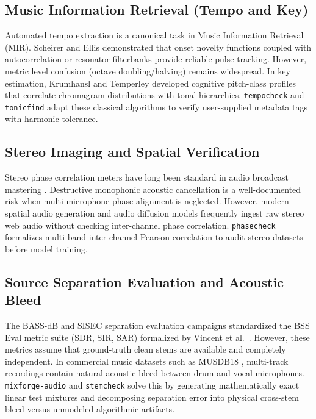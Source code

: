 \documentclass[10pt,journal,compsoc]{IEEEtran}
\begin{document}
\subsection{Music Information Retrieval (Tempo and Key)}
Automated tempo extraction is a canonical task in Music Information Retrieval (MIR). Scheirer \cite{scheirer1998tempo} and Ellis \cite{ellis2007beat} demonstrated that onset novelty functions coupled with autocorrelation or resonator filterbanks provide reliable pulse tracking. However, metric level confusion (octave doubling/halving) remains widespread. In key estimation, Krumhansl \cite{krumhansl1990cognitive} and Temperley \cite{temperley1999whats} developed cognitive pitch-class profiles that correlate chromagram distributions with tonal hierarchies. \texttt{tempocheck} and \texttt{tonicfind} adapt these classical algorithms to verify user-supplied metadata tags with harmonic tolerance.

\subsection{Stereo Imaging and Spatial Verification}
Stereo phase correlation meters have long been standard in audio broadcast mastering \cite{brixen2010audio}. Destructive monophonic acoustic cancellation is a well-documented risk when multi-microphone phase alignment is neglected. However, modern spatial audio generation and audio diffusion models frequently ingest raw stereo web audio without checking inter-channel phase correlation. \texttt{phasecheck} formalizes multi-band inter-channel Pearson correlation to audit stereo datasets before model training.

\subsection{Source Separation Evaluation and Acoustic Bleed}
The BASS-dB and SISEC separation evaluation campaigns standardized the BSS Eval metric suite (SDR, SIR, SAR) formalized by Vincent et al.\ \cite{vincent2006performance}. However, these metrics assume that ground-truth clean stems are available and completely independent. In commercial music datasets such as MUSDB18 \cite{rafii2017musdb18}, multi-track recordings contain natural acoustic bleed between drum and vocal microphones. \texttt{mixforge-audio} and \texttt{stemcheck} solve this by generating mathematically exact linear test mixtures and decomposing separation error into physical cross-stem bleed versus unmodeled algorithmic artifacts.
\end{document}
